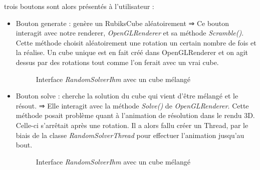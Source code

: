 trois boutons sont alors présentés à l'utilisateur :
\begin{itemize}
 	\item Bouton generate : genère un RubiksCube aléatoirement 
	    ⇒ Ce bouton interagit avec notre renderer, \textit{OpenGLRenderer} et sa méthode \textit{Scramble()}. Cette méthode choisit aléatoirement une rotation un certain nombre de fois et la réalise.
Un cube unique est en fait créé dans OpenGLRenderer et on agit dessus par des rotations tout comme l'on ferait avec un vrai cube.

\begin{figure}[H]
\begin{center}
\end{center}
	\caption{Interface  \textit{RandomSolverIhm} avec un cube mélangé}
\end{figure}

	\item Bouton solve : cherche la solution du cube qui vient d'être mélangé et le résout.
	   ⇒  Elle interagit avec la méthode \textit{Solve()} de \textit{OpenGLRenderer}. Cette méthode posait problème quant à l'animation de résolution dans le rendu 3D. Celle-ci s'arrêtait après une rotation. Il a alors
fallu créer un Thread,  par le biais de la classe \textit{RandomSolverThread} pour effectuer l'animation jusqu'au bout.
\begin{figure}[H]
\begin{center}
\end{center}
	\caption{Interface  \textit{RandomSolverIhm} avec un cube mélangé}
\end{figure}


\end{itemize}
